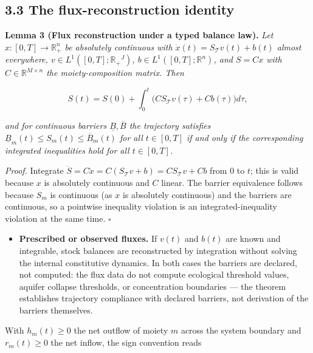 \documentclass[11pt]{article}
\begin{document}
\subsection*{3.3 The flux-reconstruction identity}\label{33-the-flux-reconstruction-identity}

\textbf{Lemma 3 (Flux reconstruction under a typed balance law).} \emph{Let \(x : [0,T] \to \mathbb{R}_+^n\) be absolutely continuous with \(\dot x(t) =\allowbreak{} S_{\mathcal{T}} v(t) +\allowbreak{} b(t)\) almost everywhere, \(v \in L^1([0,\allowbreak{}T]; \mathbb{R}_+\allowbreak{}^J)\), \(b \in L^1([0,\allowbreak{}T]; \mathbb{R}^n)\), and \(S = Cx\) with \(C \in \mathbb{R}^{M \times n}\) the moiety-composition matrix. Then} 

$$S(t) = S(0) + \int_0^t \bigl( C S_{\mathcal{T}} v(\tau) + Cb(\tau) \bigr) d\tau,$$

 \emph{and for continuous barriers \(\underline{B}, \overline{B}\) the trajectory satisfies \(\underline{B}_m(t) \le S_m(t) \le \overline{B}_m(t)\) for all \(t \in [0,T]\) if and only if the corresponding integrated inequalities hold for all \(t \in [0,T]\).}

\emph{Proof.} Integrate \(\dot S =\allowbreak{} C\dot x =\allowbreak{} C(S_{\mathcal{T}} v +\allowbreak{} b) =\allowbreak{} C S_{\mathcal{T}} v +\allowbreak{} Cb\) from \(0\) to \(t\); this is valid because \(x\) is absolutely continuous and \(C\) linear. The barrier equivalence follows because \(S_m\) is continuous (as \(x\) is absolutely continuous) and the barriers are continuous, so a pointwise inequality violation is an integrated-inequality violation at the same time. \(\square\)

\begin{itemize}\setlength{\itemsep}{2pt}
\item \textbf{Prescribed or observed fluxes.} If \(v(t)\) and \(b(t)\) are known and integrable, stock balances are reconstructed by integration without solving the internal constitutive dynamics. In both cases the barriers are declared, not computed: the flux data do not compute ecological threshold values, aquifer collapse thresholds, or concentration boundaries --- the theorem establishes trajectory compliance with declared barriers, not derivation of the barriers themselves.
\end{itemize}

With \(h_m(t) \ge 0\) the net outflow of moiety \(m\) across the system boundary and \(r_m(t) \ge 0\) the net inflow, the sign convention reads 
\end{document}
